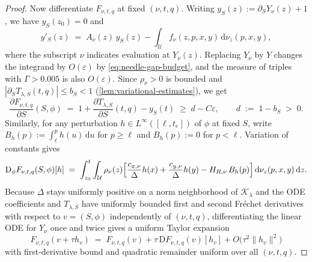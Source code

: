 \documentclass[11pt]{article}
\numberwithin{equation}{section}
\theoremstyle{plain}
\theoremstyle{definition}
\newcommand{\1}{\mathbf{1}}
\newcommand{\calK}{\mathcal{K}}
\newcommand{\calU}{\mathcal{U}}
\begin{document}
\begin{proof}
Now differentiate $F_{\nu, t, q}$ at fixed $(\nu, t, q)$. Writing $y_S(z) := \partial_S Y_\nu(z) + 1$, we have $y_S(z_0) = 0$ and
\[
  y'_S(z) \;=\; A_\nu(z)\,y_S(z) - \int_{\calU} f_\nu(z, p, x, y)\,\mathrm{d}\nu_z(p, x, y),
\]
where the subscript $\nu$ indicates evaluation at $Y_\nu(z)$. Replacing $Y_\nu$ by $Y$ changes the integrand by $O(\varepsilon)$ by \cref{eq:needle-gap-budget}, and the measure of triples with $\Gamma > 0.005$ is also $O(\varepsilon)$. Since $\rho_\nu > 0$ is bounded and $|\partial_S T_{\lambda, S}(t, q)| \le b_S < 1$ (\cref{lem:variational-estimates}), we get
\begin{equation}
  \frac{\partial F_{\nu, t, q}}{\partial S}(S, \phi) \;=\; 1 + \frac{\partial T_{\lambda, S}}{\partial S}(t, q) - y_S(t) \;\ge\; d - C\varepsilon,
  \qquad
  d \;:=\; 1 - b_S \;>\; 0.
  \label{eq:needle-scalar-sign}
\end{equation}
Similarly, for any perturbation $h \in L^\infty([\ell, t_e])$ of $\phi$ at fixed $S$, write $B_h(p) := \int_\ell^p h(u)\,\mathrm{d}u$ for $p \ge \ell$ and $B_h(p) := 0$ for $p < \ell$. Variation of constants gives
\begin{equation}
  \mathrm{D}_\phi F_{\nu, t, q}(S, \phi)[h] \;=\; \int_{z_0}^t \int_{\calU} \rho_\nu(z)\Bigl[\frac{c_{x, \nu}}{\Delta}h(x) + \frac{c_{y, \nu}}{\Delta}h(y) - H_{R, \nu}\,B_h(p)\Bigr]\,\mathrm{d}\nu_z(p, x, y)\,\mathrm{d}z.
  \label{eq:needle-score-variation}
\end{equation}
Because $\Delta$ stays uniformly positive on a norm neighborhood of $\calK_\lambda$ and the ODE coefficients and $T_{\lambda, S}$ have uniformly bounded first and second Fr\'echet derivatives with respect to $v = (S, \phi)$ independently of $(\nu, t, q)$, differentiating the linear ODE for $Y_\nu$ once and twice gives a uniform Taylor expansion
\[
  F_{\nu, t, q}(v + \tau h_v) \;=\; F_{\nu, t, q}(v) + \tau\,\mathrm{D}F_{\nu, t, q}(v)[h_v] + O\bigl(\tau^2\|h_v\|^2\bigr)
\]
with first-derivative bound and quadratic remainder uniform over all $(\nu, t, q)$.


\end{proof}
\end{document}
